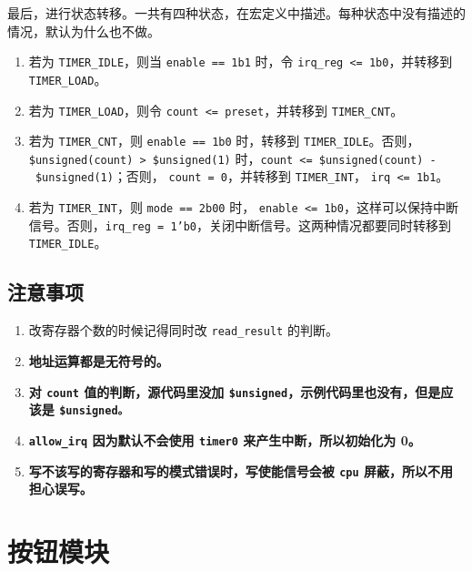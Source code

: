 \documentclass[12pt,AutoFakeBold,AutoFakeSlant]{article}
\providecommand{\tightlist}{%
  \setlength{\itemsep}{0pt}\setlength{\parskip}{0pt}}
\newcommand{\ms}[1]{\texttt{#1}}
\begin{document}
最后，进行状态转移。一共有四种状态，在宏定义中描述。每种状态中没有描述的情况，默认为什么也不做。

\begin{enumerate}
\def\labelenumi{\arabic{enumi}.}
\tightlist
\item
  若为 \texttt{TIMER\_IDLE}，则当
  \texttt{enable\ ==\ 1\textquotesingle{}b1} 时，令
  \texttt{irq\_reg\ \textless{}=\ 1\textquotesingle{}b0}，并转移到
  \texttt{TIMER\_LOAD}。
\item
  若为 \texttt{TIMER\_LOAD}，则令 \texttt{count\ \textless{}=\ preset}，并转移到 \texttt{TIMER\_CNT}。
\item
  若为 \texttt{TIMER\_CNT}，则 \texttt{enable\ ==\ 1\textquotesingle{}b0} 时，转移到 \texttt{TIMER\_IDLE}。否则，\texttt{\$unsigned(count)\ \textgreater{}\ \$unsigned(1)}
  时，\texttt{count\ \textless{}=\ \$unsigned(count)\ -\ \$unsigned(1)}；否则， \ms{count = 0}，并转移到 \texttt{TIMER\_INT}， \texttt{irq\ \textless{}=\ 1\textquotesingle{}b1}。 
\item
  若为 \texttt{TIMER\_INT}，则 \texttt{mode\ ==\ 2\textquotesingle{}b00}
  时，
  \texttt{enable\ \textless{}=\ 1\textquotesingle{}b0}，这样可以保持中断信号。否则，\ms{irq\_reg = 1'b0}，关闭中断信号。这两种情况都要同时转移到 \ms{TIMER\_IDLE}。
\end{enumerate}

\hypertarget{ux6ce8ux610fux4e8bux9879-12}{%
\subsection{注意事项}\label{ux6ce8ux610fux4e8bux9879-12}}

\begin{enumerate}
\def\labelenumi{\arabic{enumi}.}
\tightlist
\item
  改寄存器个数的时候记得同时改 \texttt{read\_result} 的判断。
\item
  \textbf{地址运算都是无符号的。}
\item
  \textbf{对 \ms{count} 值的判断，源代码里没加 \ms{\$unsigned}，示例代码里也没有，但是应该是 \ms{\$unsigned。}}
\item
  \textbf{\texttt{allow\_irq} 因为默认不会使用 \ms{timer0} 来产生中断，所以初始化为 0。}
\item
  \textbf{写不该写的寄存器和写的模式错误时，写使能信号会被 \texttt{cpu} 屏蔽，所以不用担心误写。}
\end{enumerate}

\hypertarget{ux6309ux94aeux6a21ux5757}{%
\section{按钮模块}\label{ux6309ux94aeux6a21ux5757}}
\end{document}
